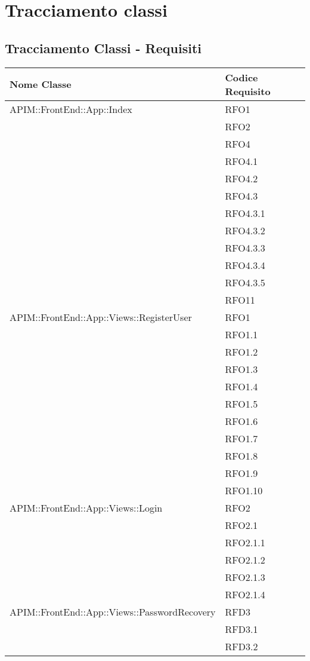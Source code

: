 \newpage
\renewcommand*{\arraystretch}{1.6}

\section{Tracciamento classi}
\subsection{Tracciamento Classi - Requisiti}
		\begin{longtable}{ p{12cm} | p{4cm} }
			\hline \rowcolor{Gray}
			\textbf{Nome Classe} & \textbf{Codice Requisito} \\
			\hline
			APIM::FrontEnd::App::Index
			& RFO1 \\
			& RFO2 \\
			& RFO4 \\
			& RFO4.1 \\
			& RFO4.2 \\
			& RFO4.3 \\
			& RFO4.3.1 \\
			& RFO4.3.2 \\
			& RFO4.3.3 \\
			& RFO4.3.4 \\
			& RFO4.3.5 \\
			& RFO11 \\
			\hline
			APIM::FrontEnd::App::Views::RegisterUser
			& RFO1 \\
			& RFO1.1 \\
			& RFO1.2 \\
			& RFO1.3 \\
			& RFO1.4 \\
			& RFO1.5 \\
			& RFO1.6 \\
			& RFO1.7 \\
			& RFO1.8 \\
			& RFO1.9 \\
			& RFO1.10 \\
			\hline
			APIM::FrontEnd::App::Views::Login
			& RFO2 \\
			& RFO2.1 \\
			& RFO2.1.1 \\
			& RFO2.1.2 \\
			& RFO2.1.3 \\
			& RFO2.1.4 \\
			\hline
			APIM::FrontEnd::App::Views::PasswordRecovery
			& RFD3 \\
			& RFD3.1 \\
			& RFD3.2 \\

\end{longtable}
